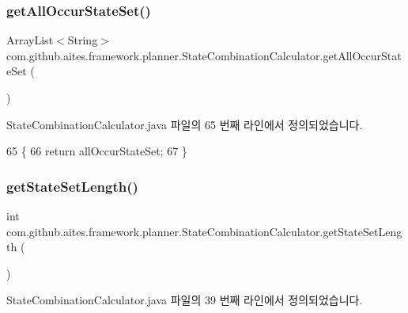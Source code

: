 \subsubsection{\texorpdfstring{get\+All\+Occur\+State\+Set()}{getAllOccurStateSet()}}
{\footnotesize\ttfamily Array\+List$<$String$>$ com.\+github.\+aites.\+framework.\+planner.\+State\+Combination\+Calculator.\+get\+All\+Occur\+State\+Set (\begin{DoxyParamCaption}{ }\end{DoxyParamCaption})}



State\+Combination\+Calculator.\+java 파일의 65 번째 라인에서 정의되었습니다.


\begin{DoxyCode}
65                                                   \{
66         \textcolor{keywordflow}{return} allOccurStateSet;
67     \}
\end{DoxyCode}
\mbox{\label{classcom_1_1github_1_1aites_1_1framework_1_1planner_1_1_state_combination_calculator_ad5a1d8670eb248155fb48cec411b74e3}} 
\subsubsection{\texorpdfstring{get\+State\+Set\+Length()}{getStateSetLength()}}
{\footnotesize\ttfamily int com.\+github.\+aites.\+framework.\+planner.\+State\+Combination\+Calculator.\+get\+State\+Set\+Length (\begin{DoxyParamCaption}{ }\end{DoxyParamCaption})}



State\+Combination\+Calculator.\+java 파일의 39 번째 라인에서 정의되었습니다.


